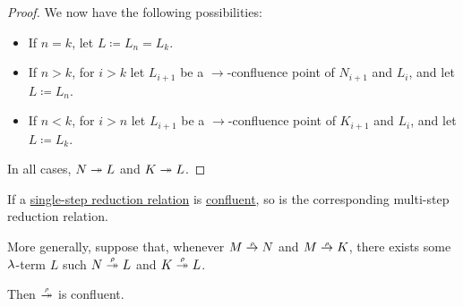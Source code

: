 \begin{proof}
  We now have the following possibilities:
  \begin{itemize}
    \item If \( n = k \), let \( L \coloneqq L_n = L_k \).
    \item If \( n > k \), for \( i > k \) let \( L_{i+1} \) be a \( {\to} \)-confluence point of \( N_{i+1} \) and \( L_i \), and let \( L \coloneqq L_n \).
    \item If \( n < k \), for \( i > n \) let \( L_{i+1} \) be a \( {\to} \)-confluence point of \( K_{i+1} \) and \( L_i \), and let \( L \coloneqq L_k \).
  \end{itemize}

  In all cases, \( N \redrel*{} L \) and \( K \redrel*{} L \).
\end{proof}

\begin{corollary}\label{thm:confluence_of_multi_step_reduction}
  If a \hyperref[def:lambda_reduction]{single-step reduction relation} is \hyperref[def:relation_confluence]{confluent}, so is the corresponding multi-step reduction relation.

  More generally, suppose that, whenever \( M \rred N \) and \( M \rred K \), there exists some \( \mathrm{\lambda} \)-term \( L \) such \( N \rred* L \) and \( K \rred* L \).

  Then \( {\rred*} \) is confluent.
\end{corollary}
